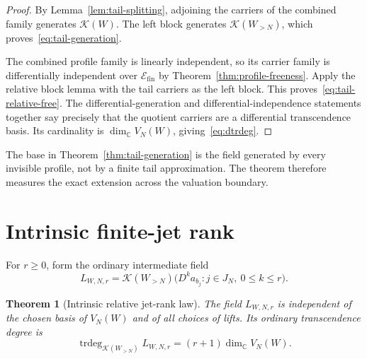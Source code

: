 \documentclass[11pt]{article}
\newtheorem{theorem}{Theorem}[section]
\theoremstyle{definition}
\theoremstyle{remark}
\newcommand{\C}{\mathbb C}
\newcommand{\Efin}{\mathcal E_{\mathrm{fin}}}
\newcommand{\K}{\mathcal K}
\newcommand{\trdeg}{\operatorname{trdeg}}
\begin{document}
\begin{proof}
By Lemma~\ref{lem:tail-splitting}, adjoining the carriers of the combined family generates
$\K(W)$.  The left block generates $\K(W_{>N})$, which proves~\eqref{eq:tail-generation}.

The combined profile family is linearly independent, so its carrier family is differentially
independent over $\Efin$ by Theorem~\ref{thm:profile-freeness}.  Apply the relative block lemma
with the tail carriers as the left block.  This proves~\eqref{eq:tail-relative-free}.  The
differential-generation and differential-independence statements together say precisely that the
quotient carriers are a differential transcendence basis.  Its cardinality is
$\dim_\C V_N(W)$, giving~\eqref{eq:dtrdeg}.
\end{proof}

The base in Theorem~\ref{thm:tail-generation} is the field generated by every invisible profile,
not by a finite tail approximation.  The theorem therefore measures the exact extension across
the valuation boundary.

\section{Intrinsic finite-jet rank}\label{sec:jet-rank}

For $r\ge0$, form the ordinary intermediate field
\begin{equation}\label{eq:finite-jet-field}
 L_{W,N,r}=\K(W_{>N})
 \bigl(D^ka_{b_j}:j\in J_N,\ 0\le k\le r\bigr).
\end{equation}

\begin{theorem}[Intrinsic relative jet-rank law]\label{thm:jet-rank}
The field $L_{W,N,r}$ is independent of the chosen basis of $V_N(W)$ and of all choices of lifts.
Its ordinary transcendence degree is
\begin{equation}\label{eq:jet-rank}
 \trdeg_{\K(W_{>N})}L_{W,N,r}
   =(r+1)\dim_\C V_N(W).
\end{equation}
\end{theorem}
\end{document}

